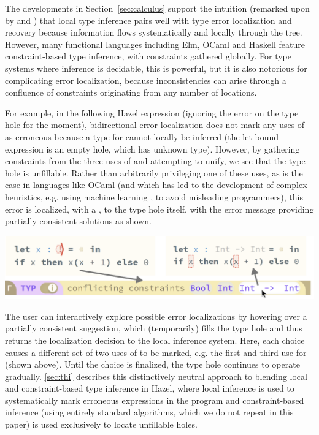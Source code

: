 % 

The developments in Section~\ref{sec:calculus} support the intuition (remarked upon by \citet{Localinf} and \citet{BidirTyping}) that local type inference pairs well with type error localization and recovery because information flows systematically and locally through the tree. However, many functional languages including Elm, OCaml and Haskell feature constraint-based type inference, with constraints gathered globally. For type systems where inference is decidable, this is powerful, but it is also notorious for complicating error localization, because inconsistencies can arise through a confluence of constraints originating from any number of locations. 

For example, in the following Hazel expression (ignoring the error on the type hole for the moment), bidirectional error localization 
does not mark any uses of  as erroneous because a type for  cannot locally be inferred (the let-bound expression is an empty hole, which has unknown type). However, by gathering constraints from the three uses of  and attempting to unify, we see that the type hole is unfillable. Rather than arbitrarily privileging one of these uses, as is the case in languages like OCaml (and which has led to the development of complex heuristics, e.g. using machine learning \cite{SeidelBlame}, to avoid misleading programmers), this error is localized, with a \li{!}, to the type hole itself, with the error message providing partially consistent solutions as shown.
\begin{center}
\vspace{-3px}
    \includegraphics[scale=0.4]{images/figSugg.png}
\end{center}


The user can interactively explore possible error localizations by hovering over a partially consistent suggestion, which (temporarily) fills the type hole and thus returns the localization decision to the local inference system.
Here, each choice causes a different set of two uses of  to be marked, e.g. the first and third use for  (shown above). Until the choice is finalized, the type hole continues to operate gradually.
\cref{sec:thi} describes this distinctively neutral approach to blending local and constraint-based type inference in Hazel, where local inference is used to systematically mark erroneous expressions in the program and constraint-based inference (using entirely standard algorithms, which we do not repeat in this paper) is used exclusively to locate unfillable holes.
